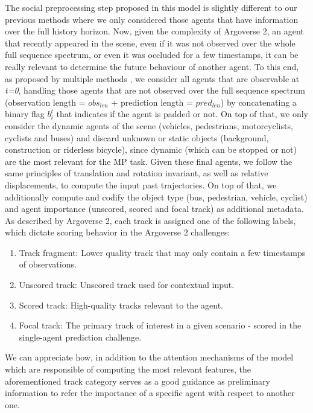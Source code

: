 The social preprocessing step proposed in this model is slightly different to our previous methods where we only considered those agents that have information over the full history horizon. Now, given the complexity of Argoverse 2, an agent that recently appeared in the scene, even if it was not observed over the whole full sequence spectrum, or even it was occluded for a few timestamps, it can be really relevant to determine the future behaviour of another agent. To this end, as proposed by multiple methods \cite{liang2020learning, schmidt2022crat}, we consider all agents that are observable at \textit{t=0}, handling those agents that are not observed over the full sequence spectrum (observation length = \textit{$obs_{len}$} + prediction length = \textit{$pred_{len}$}) by concatenating a binary flag $b_i^t$ that indicates if the agent is padded or not. On top of that, we only consider the dynamic agents of the scene (vehicles, pedestrians, motorcyclists, cyclists and buses) and discard unknown or static objects (background, construction or riderless bicycle), since dynamic (which can be stopped or not) are the most relevant for the \ac{MP} task. Given these final agents, we follow the same principles of translation and rotation invariant, as well as relative displacements, to compute the input past trajectories. On top of that, we additionally compute and codify the object type (bus, pedestrian, vehicle, cyclist) and agent importance (unscored, scored and focal track) as additional metadata. As described by Argoverse 2, each track is assigned one of the following labels, which dictate scoring behavior in the Argoverse 2 challenges:

\begin{enumerate}
	\item Track fragment: Lower quality track that may only contain a few timestamps of observations.
	\item Unscored track: Unscored track used for contextual input.
	\item Scored track: High-quality tracks relevant to the agent.
	\item Focal track: The primary track of interest in a given scenario - scored in the single-agent prediction challenge.
\end{enumerate}

We can appreciate how, in addition to the attention mechanisms of the model which are responsible of computing the most relevant features, the aforementioned track category serves as a good guidance as preliminary information to refer the importance of a specific agent with respect to another one.

